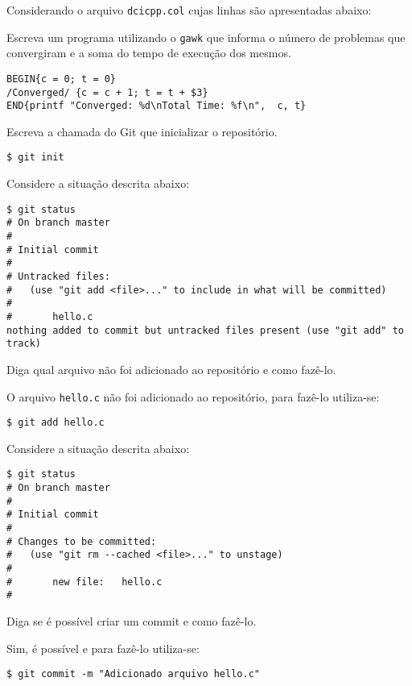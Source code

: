 \begin{Exercise}[label={0007}, difficulty={1}, origin={gawk}]
  Considerando o arquivo \lstinline+dcicpp.col+ cujas linhas são
  apresentadas abaixo:
  
  Escreva um programa utilizando o \lstinline+gawk+ que informa o número de
  problemas que convergiram e a soma do tempo de execução dos mesmos.
\end{Exercise}
\begin{Answer}[ref={007}]
  \begin{lstlisting}
BEGIN{c = 0; t = 0}
/Converged/ {c = c + 1; t = t + $3}
END{printf "Converged: %d\nTotal Time: %f\n",  c, t}
  \end{lstlisting}
\end{Answer}

\begin{Exercise}[label={0008}, difficulty={0}, origin={git}]
  Escreva a chamada do Git que inicializar o repositório.
\end{Exercise}
\begin{Answer}[ref={0008}]
  \begin{lstlisting}
$ git init
  \end{lstlisting}
\end{Answer}

\begin{Exercise}[label={0009}, difficulty={0}, origin={git}]
  Considere a situação descrita abaixo:
  \begin{lstlisting}
$ git status
# On branch master
#
# Initial commit
#
# Untracked files:
#   (use "git add <file>..." to include in what will be committed)
#
#       hello.c
nothing added to commit but untracked files present (use "git add" to track)
  \end{lstlisting}
  Diga qual arquivo não foi adicionado ao repositório e como fazê-lo.
\end{Exercise}
\begin{Answer}[ref={0009}]
  O arquivo \lstinline+hello.c+ não foi adicionado ao repositório, para fazê-lo
  utiliza-se:
  \begin{lstlisting}
$ git add hello.c
  \end{lstlisting}
\end{Answer}

\begin{Exercise}[label={0010}, difficulty={0}, origin={git}]
  Considere a situação descrita abaixo:
  \begin{lstlisting}
$ git status
# On branch master
#
# Initial commit
#
# Changes to be committed:
#   (use "git rm --cached <file>..." to unstage)
#
#       new file:   hello.c
#
  \end{lstlisting}
  Diga se é possível criar um commit e como fazê-lo.
\end{Exercise}
\begin{Answer}[ref={0010}]
  Sim, é possível e para fazê-lo utiliza-se:
  \begin{lstlisting}
$ git commit -m "Adicionado arquivo hello.c"
  \end{lstlisting}
\end{Answer}

